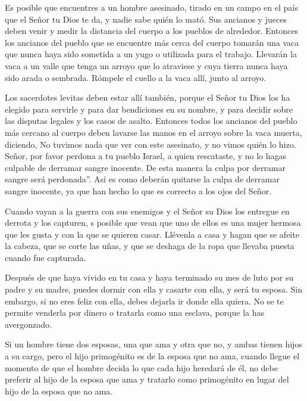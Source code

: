  Es posible que encuentres a un hombre asesinado, tirado en
un campo en el país que el Señor tu Dios te da, y nadie sabe quién lo
mató.  Sus ancianos y jueces deben venir y medir la
distancia del cuerpo a los pueblos de alrededor.  Entonces
los ancianos del pueblo que se encuentre más cerca del cuerpo tomarán
una vaca que nunca haya sido sometida a un yugo o utilizada para el
trabajo.  Llevarán la vaca a un valle que tenga un arroyo
que lo atraviese y cuya tierra nunca haya sido arada o sembrada. Rómpele
el cuello a la vaca allí, junto al arroyo.

 Los sacerdotes levitas deben estar allí también, porque el
Señor tu Dios los ha elegido para servirle y para dar bendiciones en su
nombre, y para decidir sobre las disputas legales y los casos de asalto.
 Entonces todos los ancianos del pueblo más cercano al
cuerpo deben lavarse las manos en el arroyo sobre la vaca muerta,
diciendo,  No tuvimos nada que ver con este asesinato, y no
vimos quién lo hizo.  Señor, por favor perdona a tu pueblo
Israel, a quien rescataste, y no lo hagas culpable de derramar sangre
inocente. De esta manera la culpa por derramar sangre será perdonada''.
 Así es como deberán quitarse la culpa de derramar sangre
inocente, ya que han hecho lo que es correcto a los ojos del Señor.

 Cuando vayan a la guerra con sus enemigos y el Señor su
Dios los entregue en derrota y los capturen,  s posible que
vean que uno de ellos es una mujer hermosa que les gusta y con la que se
quieren casar.  Llévenla a casa y hagan que se afeite la
cabeza, que se corte las uñas,  y que se deshaga de la ropa
que llevaba puesta cuando fue capturada.

Después de que haya vivido en tu casa y haya terminado su mes de luto
por su padre y su madre, puedes dormir con ella y casarte con ella, y
será tu esposa.  Sin embargo, si no eres feliz con ella,
debes dejarla ir donde ella quiera. No se te permite venderla por dinero
o tratarla como una esclava, porque la has avergonzado.

 Si un hombre tiene dos esposas, una que ama y otra que no,
y ambas tienen hijos a su cargo, pero el hijo primogénito es de la
esposa que no ama,  cuando llegue el momento de que el
hombre decida lo que cada hijo heredará de él, no debe preferir al hijo
de la esposa que ama y tratarlo como primogénito en lugar del hijo de la
esposa que no ama.

